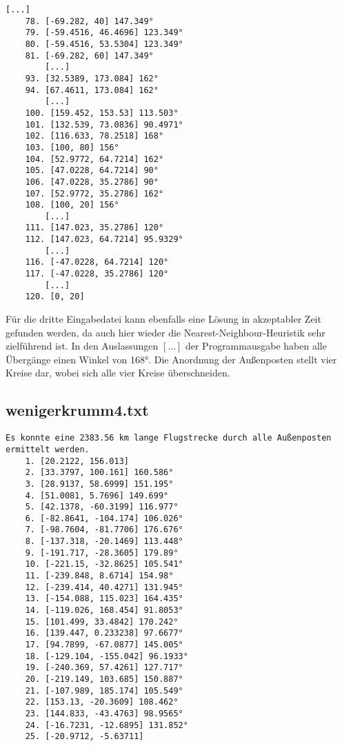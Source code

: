 \documentclass[a4paper,10pt,ngerman]{scrartcl}
\begin{document}
\begin{lstlisting}[frame=single, title=Programmausgabe wenigerkrumm3.txt, breaklines=true,label={lst:lstlisting4}]
        [...]
    78. [-69.282, 40] 147.349°
    79. [-59.4516, 46.4696] 123.349°
    80. [-59.4516, 53.5304] 123.349°
    81. [-69.282, 60] 147.349°
        [...]
    93. [32.5389, 173.084] 162°
    94. [67.4611, 173.084] 162°
        [...]
    100. [159.452, 153.53] 113.503°
    101. [132.539, 73.0836] 90.4971°
    102. [116.633, 78.2518] 168°
    103. [100, 80] 156°
    104. [52.9772, 64.7214] 162°
    105. [47.0228, 64.7214] 90°
    106. [47.0228, 35.2786] 90°
    107. [52.9772, 35.2786] 162°
    108. [100, 20] 156°
        [...]
    111. [147.023, 35.2786] 120°
    112. [147.023, 64.7214] 95.9329°
        [...]
    116. [-47.0228, 64.7214] 120°
    117. [-47.0228, 35.2786] 120°
        [...]
    120. [0, 20]
    \end{lstlisting}

    Für die dritte Eingabedatei kann ebenfalls eine Lösung in akzeptabler Zeit gefunden werden,
    da auch hier wieder die Nearest-Neighbour-Heuristik sehr zielführend ist.
    In den Auslassungen $[\dots]$ der Programmausgabe haben alle Übergänge einen Winkel von 168°.
    Die Anordnung der Außenposten stellt vier Kreise dar, wobei sich alle vier Kreise überschneiden.

    \subsection{wenigerkrumm4.txt}\label{subsec:wenigerkrumm4.txt}

    \begin{lstlisting}[frame=single, title=Programmausgabe wenigerkrumm4.txt, breaklines=true,label={lst:lstlisting4}]
    Es konnte eine 2383.56 km lange Flugstrecke durch alle Außenposten ermittelt werden.
    1. [20.2122, 156.013]
    2. [33.3797, 100.161] 160.586°
    3. [28.9137, 58.6999] 151.195°
    4. [51.0081, 5.7696] 149.699°
    5. [42.1378, -60.3199] 116.977°
    6. [-82.8641, -104.174] 106.026°
    7. [-98.7604, -81.7706] 176.676°
    8. [-137.318, -20.1469] 113.448°
    9. [-191.717, -28.3605] 179.89°
    10. [-221.15, -32.8625] 105.541°
    11. [-239.848, 8.6714] 154.98°
    12. [-239.414, 40.4271] 131.945°
    13. [-154.088, 115.023] 164.435°
    14. [-119.026, 168.454] 91.8053°
    15. [101.499, 33.4842] 170.242°
    16. [139.447, 0.233238] 97.6677°
    17. [94.7899, -67.0877] 145.005°
    18. [-129.104, -155.042] 96.1933°
    19. [-240.369, 57.4261] 127.717°
    20. [-219.149, 103.685] 150.887°
    21. [-107.989, 185.174] 105.549°
    22. [153.13, -20.3609] 108.462°
    23. [144.833, -43.4763] 98.9565°
    24. [-16.7231, -12.6895] 131.852°
    25. [-20.9712, -5.63711]
    \end{lstlisting}
\end{document}
